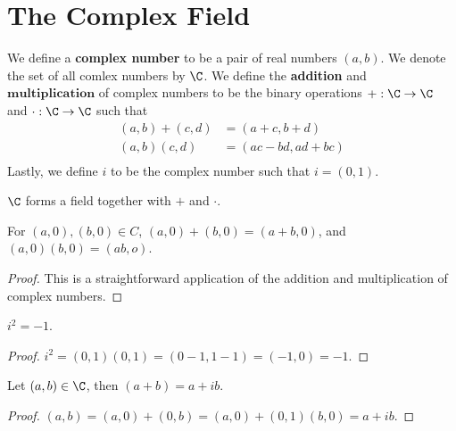 
\section{The Complex Field}

\begin{definition}
    We define a \textbf{complex number} to be a pair of real numbers  $(a,b)$. We denote the 
    set of all comlex numbers by $\C$. We define the \textbf{addition} and $\textbf{multiplication}$ of 
    complex numbers to be the binary operations $+:\C \rightarrow \C$ and $\cdot: \C \rightarrow \C$ such that 
        \begin{align*}
            (a,b)+(c,d) &= (a+c,b+d) \\
            (a,b)(c,d) &= (ac-bd,ad+bc) \\
        \end{align*}
        Lastly, we define $i$ to be the complex number such that  $i=(0,1)$.
\end{definition}

\begin{theorem}\label{1.4.1}
    $\C$ forms a field together with  $+$ and  $\cdot$.
\end{theorem}

\begin{theorem}\label{1.4.2}
    For $(a,0),(b,0) \in C$,  $(a,0)+(b,0)=(a+b,0)$, and $(a,0)(b,0)=(ab,o)$.
\end{theorem}
\begin{proof}
    This is a straightforward application of the addition and multiplication of 
    complex numbers.
\end{proof}

\begin{theorem}\label{1.4.3}
    $i^2=-1$.
\end{theorem}
\begin{proof}
    $i^2=(0,1)(0,1)=(0-1,1-1)=(-1,0)=-1$.		
\end{proof}

\begin{theorem}\label{1.4.4}
    Let $(a,b) \in \C$, then  $(a+b)=a+ib$.
\end{theorem}
\begin{proof}
    $(a,b)=(a,0)+(0,b)=(a,0)+(0,1)(b,0)=a+ib$.	
\end{proof}

